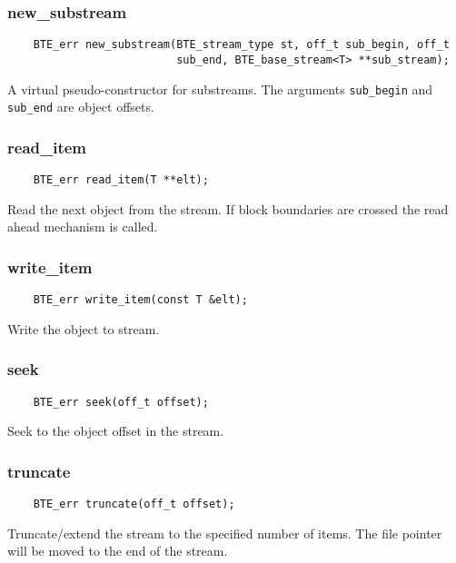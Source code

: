 \subsubsection{new\_substream}
\begin{verbatim}
    BTE_err new_substream(BTE_stream_type st, off_t sub_begin, off_t
                          sub_end, BTE_base_stream<T> **sub_stream);
\end{verbatim}
A virtual pseudo-constructor for substreams. The arguments \verb|sub_begin| and
\verb|sub_end| are object offsets.


\subsubsection{read\_item}
\begin{verbatim}
    BTE_err read_item(T **elt);
\end{verbatim}
Read the next object from the stream. If block boundaries are crossed the
read ahead mechanism is called.

\subsubsection{write\_item}
\begin{verbatim}
    BTE_err write_item(const T &elt);
\end{verbatim}
Write the object to stream.


\subsubsection{seek}
\begin{verbatim}
    BTE_err seek(off_t offset);
\end{verbatim}
Seek to the object offset in the stream.


\subsubsection{truncate}
\begin{verbatim}
    BTE_err truncate(off_t offset);
\end{verbatim}
Truncate/extend the stream to the specified number of items. The file
pointer will be moved to the end of the stream.


